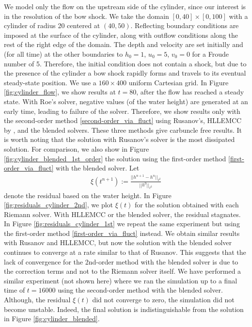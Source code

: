 \documentclass[preprint, 11pt]{article}
\begin{document}
We model only the flow on the upstream side of the cylinder, since
our interest is in the resolution of the bow shock.  We take the domain
$[0,40]\times[0,100]$ with a cylinder of radius 20 centered at $(40,50)$.
Reflecting boundary conditions are imposed at the surface of the cylinder,
along with outflow conditions along the rest of the right edge of the domain.
The depth and velocity are set initially and (for all time) at the other
boundaries to $h_0=1$, $u_0=5$, $v_0=0$ for a Froude number of 5. Therefore, 
the initial condition does not contain a shock, but due to the presence of the 
cylinder a bow shock rapidly forms and travels to its eventual steady-state position.
We use a $160 \times 400$ uniform Cartesian grid.
%
In Figure \ref{fig:cylinder_flow}, we show results at $t=80$, after the flow has reached
a steady state.  With Roe's solver, negative values (of the water height) are generated at an early
time, leading to failure of the solver.  Therefore, we show results only with the 
{\color{OliveGreen} second-order method}
\eqref{second-order_via_fluct} using Rusanov's, HLLEMCC by \cite{kemm2014note}, and the blended solvers.
These three methods give carbuncle free results.
It is worth noting that the solution with Rusanov's solver is the most dissipated solution. 
{\color{OliveGreen}
For comparison, we also show in Figure \ref{fig:cylinder_blended_1st_order} 
the solution using the first-order method \eqref{first-order_via_fluct}
with the blended solver.}
Let 
\begin{align}\label{res}
  \xi(t^{n+1}):=\frac{||h^{n+1}-h^n||_{\ell^2}}{||h^0||_{\ell^2}}
\end{align}
denote the residual based on the water height. In Figure \ref{fig:residuals_cylinder_2nd}, we plot $\xi(t)$ for the
solution obtained with each Riemann solver. With HLLEMCC or the blended solver, the residual stagnates. 
In Figure \ref{fig:residuals_cylinder_1st} we repeat the same experiment but using the first-order method \eqref{first-order_via_fluct} instead.
We obtain similar results with Rusanov and HLLEMCC, but now the solution with the blended solver continues to converge
at a rate similar to that of Rusanov.  This suggests that the lack of convergence for the 2nd-order method with the
blended solver is due to the correction terms and not to the Riemann solver itself.
{\color{OliveGreen} We have performed a similar experiment (not shown here) where we ran the simulation
up to a final time of $t=16000$ using the second-order method with the blended solver. Although, the 
residual $\xi(t)$ did not converge to zero, the simulation did not become unstable. Indeed, the 
final solution is indistinguishable from the solution in Figure \ref{fig:cylinder_blended}.}
\end{document}
